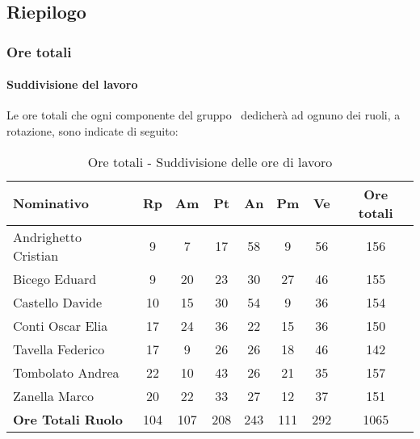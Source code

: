 \documentclass[../PianoProgetto.tex]{subfiles}
\begin{document}
	\subsection{Riepilogo}
			\subsubsection{Ore totali}
				\paragraph{Suddivisione del lavoro}
					Le ore totali che ogni componente del gruppo \leaf\ dedicherà ad ognuno dei ruoli, a rotazione, sono indicate di seguito:
	
	\begin{table}[h]
		\begin{tabularx}{\textwidth}{l  * {6}{C}  c}
			\toprule
			\textbf{Nominativo} & \textbf{Rp} & \textbf{Am} & \textbf{Pt} 
						& \textbf{An} & \textbf{Pm} & \textbf{Ve} & \textbf{Ore totali} \\
			\midrule
			Andrighetto Cristian & 9 & 7 & 17 & 58 & 9 & 56 &	156 \\
			Bicego Eduard & 9 & 20 & 23 & 30 & 27 & 46 & 155 \\
			Castello Davide & 10 & 15 & 30 & 54 & 9 & 36 & 154 \\
			Conti Oscar Elia & 17 & 24 & 36 & 22 & 15 & 36 & 150 \\
			Tavella Federico &	17 & 9 & 26 & 26 & 18 & 46 & 142 \\
			Tombolato Andrea & 22 & 10 & 43 & 26 & 21 & 35 & 157 \\
			Zanella Marco & 20 & 22 & 33 & 27 & 12 & 37 & 151 \\
			\midrule			
			\textbf{Ore Totali Ruolo} & 104 & 107 & 208 & 243 & 111 & 292 & 1065 \\
			\bottomrule
		\end{tabularx}
		
		\caption{Ore totali - Suddivisione delle ore di lavoro}
		\label{tab:totale_ore}
		
	\end{table}
	
	
\end{document}

